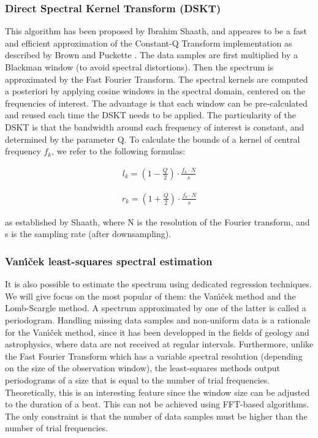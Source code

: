 \documentclass[letterpaper]{article}
\begin{document}
\subsubsection{Direct Spectral Kernel Transform (DSKT)}

This algorithm has been proposed by Ibrahim Sha\textquotesingle ath, and appeares to be a fast and efficient approximation of the Constant-Q Transform implementation as described by Brown and Puckette \citep{CQT}.
The data samples are first multiplied by a Blackman window (to avoid spectral distortions). Then the spectrum is approximated by the Fast Fourier Transform.
The spectral kernels are computed a posteriori by applying cosine windows in the spectral domain, centered on the frequencies of interest. The advantage is that each window can be pre-calculated and reused each time the DSKT needs to be applied. The particularity of the DSKT is that the bandwidth around each frequency of interest is constant, and determined by the parameter Q. To calculate the bounds of a kernel of central frequency $ f_k $, we refer to the following formulas:

\begin{align}
l_k  = (1 - \frac{Q}{2}) \cdot \frac{f_k \cdot N}{s}
\end{align}

\begin{align}
r_k  = (1 + \frac{Q}{2}) \cdot \frac{f_k \cdot N}{s}
\end{align}

\noindent as established by Sha\textquotesingle ath, where N is the resolution of the Fourier transform, and s is the sampling rate (after downsampling).

\subsubsection{Van\'{\i}\v{c}ek least-squares spectral estimation}

It is also possible to estimate the spectrum using dedicated regression techniques. We will give focus on the most popular of them:
the Van\'{\i}\v{c}ek method and the Lomb-Scargle method. A spectrum approximated by one of the latter is called a periodogram.
Handling missing data samples and non-uniform data is a rationale for the Van\'{\i}\v{c}ek method, since it has been developped in the fields of
geology and astrophysics, where data are not received at regular intervals. Furthermore, unlike the Fast Fourier Transform which has a
variable spectral resolution (depending on the size of the observation window), the least-squares methods output periodograms of a size
that is equal to the number of trial frequencies. Theoretically, this is an interesting feature since the window size can be adjusted to the duration of a beat. This can not be achieved using FFT-based algorithms. The only constraint is that the number of data samples must be higher than the number of trial frequencies.\\
\end{document}
